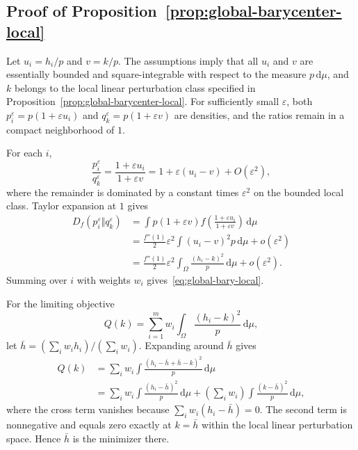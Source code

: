 \documentclass[runningheads]{llncs}
\newcommand{\dd}{\,\mathrm{d}}
\begin{document}
\subsection*{Proof of Proposition~\ref{prop:global-barycenter-local}}

Let $u_i=h_i/p$ and $v=k/p$. The assumptions imply that all $u_i$ and $v$ are essentially bounded and square-integrable with respect to the measure $p\dd\mu$, and $k$ belongs to the local linear perturbation class specified in Proposition~\ref{prop:global-barycenter-local}. For sufficiently small $\varepsilon$, both $p_i^\varepsilon=p(1+\varepsilon u_i)$ and $q_k^\varepsilon=p(1+\varepsilon v)$ are densities, and the ratios remain in a compact neighborhood of $1$.

For each $i$,
\begin{equation*}
  \frac{p_i^\varepsilon}{q_k^\varepsilon}
  =\frac{1+\varepsilon u_i}{1+\varepsilon v}
  =1+\varepsilon(u_i-v)+O(\varepsilon^2),
\end{equation*}
where the remainder is dominated by a constant times $\varepsilon^2$ on the bounded local class. Taylor expansion at $1$ gives
\begin{align*}
  D_f(p_i^\varepsilon\Vert q_k^\varepsilon)
  &=\int p(1+\varepsilon v)
      f\!\left(\frac{1+\varepsilon u_i}{1+\varepsilon v}\right)\dd\mu\\
  &=\frac{f''(1)}{2}\varepsilon^2
      \int (u_i-v)^2p\dd\mu+o(\varepsilon^2)\\
  &=\frac{f''(1)}{2}\varepsilon^2
      \int_\Omega\frac{(h_i-k)^2}{p}\dd\mu+o(\varepsilon^2).
\end{align*}
Summing over $i$ with weights $w_i$ gives~\eqref{eq:global-bary-local}.

For the limiting objective
\begin{equation*}
  Q(k)=\sum_{i=1}^m w_i\int_\Omega\frac{(h_i-k)^2}{p}\dd\mu,
\end{equation*}
let $\bar h=(\sum_iw_ih_i)/(\sum_iw_i)$. Expanding around $\bar h$ gives
\begin{align*}
  Q(k)
  &=\sum_i w_i\int\frac{(h_i-\bar h+\bar h-k)^2}{p}\dd\mu\\
  &=\sum_i w_i\int\frac{(h_i-\bar h)^2}{p}\dd\mu
    +\left(\sum_iw_i\right)\int\frac{(k-\bar h)^2}{p}\dd\mu,
\end{align*}
where the cross term vanishes because $\sum_iw_i(h_i-\bar h)=0$. The second term is nonnegative and equals zero exactly at $k=\bar h$ within the local linear perturbation space. Hence $\bar h$ is the minimizer there.
\end{document}
